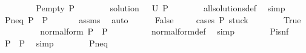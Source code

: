 \begin{isabellebody}
\ \ \isamarkupfalse%
\isanewline
\ \ \ \ \isamarkupfalse%
\ P{\isacharunderscore}{\kern0pt}empty{\isacharcolon}{\kern0pt}\ {\isachardoublequoteopen}P\ {\isacharequal}{\kern0pt}\ {\isacharparenleft}{\kern0pt}{\isacharbrackleft}{\kern0pt}{\isacharbrackright}{\kern0pt}{\isacharcomma}{\kern0pt}{\isacharbrackleft}{\kern0pt}{\isacharbrackright}{\kern0pt}{\isacharparenright}{\kern0pt}{\isachardoublequoteclose}\isanewline
\ \ \ \ \isamarkupfalse%
\ solution{\isacharcolon}{\kern0pt}\ {\isachardoublequoteopen}{\isacharparenleft}{\kern0pt}{\isacharbraceleft}{\kern0pt}{\isacharbraceright}{\kern0pt}{\isacharcomma}{\kern0pt}{\isacharbrackleft}{\kern0pt}{\isacharbrackright}{\kern0pt}{\isacharparenright}{\kern0pt}\ {\isasymin}\ U\ P{\isachardoublequoteclose}\isanewline
\ \ \ \ \ \ \isamarkupfalse%
\ all{\isacharunderscore}{\kern0pt}solutions{\isacharunderscore}{\kern0pt}def\ \isamarkupfalse%
\ simp\isanewline
\ \ \ \ \isamarkupfalse%
\ P{\isacharunderscore}{\kern0pt}neq{\isacharcolon}{\kern0pt}\ {\isachardoublequoteopen}P\ {\isasymnoteq}\ P{}{\isachardoublequoteclose}\ \isanewline
\ \ \ \ \isamarkupfalse%
\ assms\ \isamarkupfalse%
\ auto\isanewline
\ \ \ \ \isamarkupfalse%
\ False\isanewline
\ \ \ \ \isamarkupfalse%
{\isacharparenleft}{\kern0pt}cases\ {\isachardoublequoteopen}P{}{\isasymin}\ stuck{\isachardoublequoteclose}{\isacharparenright}{\kern0pt}\isanewline
\ \ \ \ \ \ \isamarkupfalse%
\ True\isanewline
\ \ \ \ \ \ \isamarkupfalse%
\ \isamarkupfalse%
\ {\isachardoublequoteopen}normal{\isacharunderscore}{\kern0pt}form\ P{}\ {\isacharequal}{\kern0pt}\ {\isacharbraceleft}{\kern0pt}P{}{\isacharbraceright}{\kern0pt}{\isachardoublequoteclose}\isanewline
\ \ \ \ \ \ \ \ \isamarkupfalse%
\ normal{\isacharunderscore}{\kern0pt}form{\isacharunderscore}{\kern0pt}def\ \isamarkupfalse%
\ simp\isanewline
\ \ \ \ \ \ \isamarkupfalse%
\ P{\isacharunderscore}{\kern0pt}is{\isacharunderscore}{\kern0pt}nf\ \isamarkupfalse%
\ {\isachardoublequoteopen}P\ {\isacharequal}{\kern0pt}\ P{}{\isachardoublequoteclose}\ \isamarkupfalse%
\ simp\isanewline
\ \ \ \ \ \ \isamarkupfalse%
\ P{\isacharunderscore}{\kern0pt}neq\ \isamarkupfalse%

\end{isabellebody}
